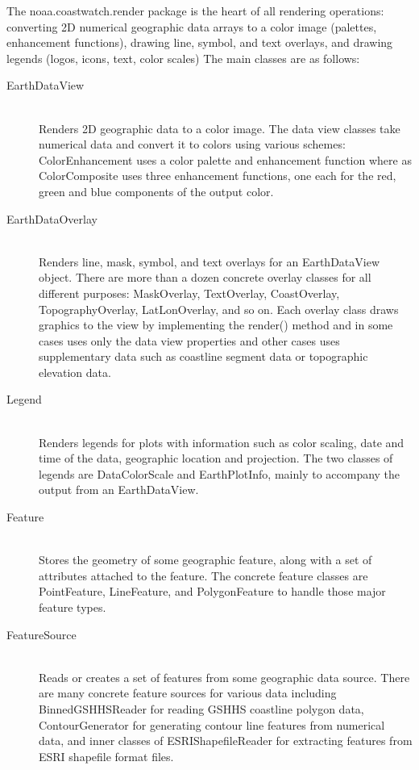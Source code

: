 The {\java noaa.coastwatch.render} package is the heart of all
rendering operations: converting 2D numerical geographic data
arrays to a color image (palettes, enhancement functions),
drawing line, symbol, and text overlays, and drawing legends
(logos, icons, text, color scales) The main classes are as
follows:
\begin{description}

\item[{\java EarthDataView}]~\\ Renders 2D geographic data to a
color image.  The data view classes take numerical data and
convert it to colors using various schemes: {\java
ColorEnhancement} uses a color palette and enhancement function
where as {\java ColorComposite} uses three enhancement functions,
one each for the red, green and blue components of the output
color.

\item[{\java EarthDataOverlay}]~\\ Renders line, mask, symbol,
and text overlays for an {\java EarthDataView} object.  There are
more than a dozen concrete overlay classes for all different
purposes: {\java MaskOverlay}, {\java TextOverlay}, {\java
CoastOverlay}, {\java TopographyOverlay}, {\java LatLonOverlay},
and so on.  Each overlay class draws graphics to the view by
implementing the {\java render()} method and in some cases uses
only the data view properties and other cases uses supplementary
data such as coastline segment data or topographic elevation
data.

\item[{\java Legend}]~\\ Renders legends for plots with
information such as color scaling, date and time of the data,
geographic location and projection.  The two classes of legends
are {\java DataColorScale} and {\java EarthPlotInfo}, mainly to
accompany the output from an {\java EarthDataView}.

\item[{\java Feature}]~\\ Stores the geometry of some geographic
feature, along with a set of attributes attached to the feature.
The concrete feature classes are {\java PointFeature}, {\java
LineFeature}, and {\java PolygonFeature} to handle those major
feature types.

\item[{\java FeatureSource}]~\\ Reads or creates a set of
features from some geographic data source.  There are many
concrete feature sources for various data including {\java
BinnedGSHHSReader} for reading GSHHS coastline polygon data,
{\java ContourGenerator} for generating contour line features
from numerical data, and inner classes of {\java
ESRIShapefileReader} for extracting features from ESRI shapefile
format files.


\end{description}
